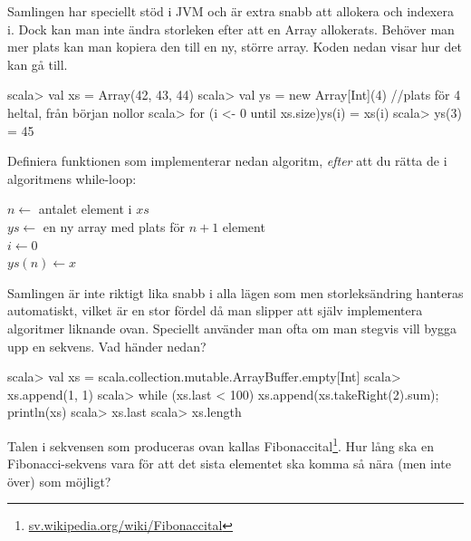 \Subtask Samlingen  har speciellt stöd i JVM och är extra snabb att allokera och indexera i. Dock kan man inte ändra storleken efter att en Array allokerats. Behöver man mer plats kan man kopiera den till en ny, större array. Koden nedan visar hur det kan gå till.
\begin{REPL}
scala> val xs = Array(42, 43, 44)
scala> val ys = new Array[Int](4)  //plats för 4 heltal, från början nollor
scala> for (i <- 0 until xs.size){ys(i) = xs(i)}
scala> ys(3) = 45
\end{REPL}
Definiera funktionen  som implementerar nedan algoritm, \emph{efter} att du rätta de \textbf{\color{red}{två buggarna}} i algoritmens while-loop:

\begin{algorithm}[H]

 $n \leftarrow$ antalet element i $xs$ \\
 $ys \leftarrow$ en ny array med plats för $n + 1$ element\\
 $i \leftarrow 0$  \\
 $ys(n) \leftarrow x$
\end{algorithm}



\Subtask Samlingen  är inte riktigt lika snabb i alla lägen som  men storleksändring hanteras automatiskt, vilket är en stor fördel då man slipper att själv implementera algoritmer liknande  ovan. Speciellt använder man ofta  om man stegvis vill bygga upp en sekvens. Vad händer nedan?
\begin{REPL}
scala> val xs = scala.collection.mutable.ArrayBuffer.empty[Int]
scala> xs.append(1, 1)
scala> while (xs.last < 100) {xs.append(xs.takeRight(2).sum); println(xs)}
scala> xs.last
scala> xs.length
\end{REPL}

\Subtask Talen i sekvensen som produceras ovan kallas Fibonaccital\footnote{\href{https://sv.wikipedia.org/wiki/Fibonaccital}{sv.wikipedia.org/wiki/Fibonaccital}}. Hur lång ska en Fibonacci-sekvens vara för att det sista elementet ska komma så nära (men inte över)  som möjligt?



